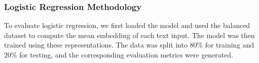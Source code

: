\subsubsection{Logistic Regression Methodology}
To evaluate logistic regression, we first loaded the model and used the balanced dataset to compute the mean embedding of each text input. The model was then trained using these representations. The data was split into 80\% for training and 20\% for testing, and the corresponding evaluation metrics were generated.
